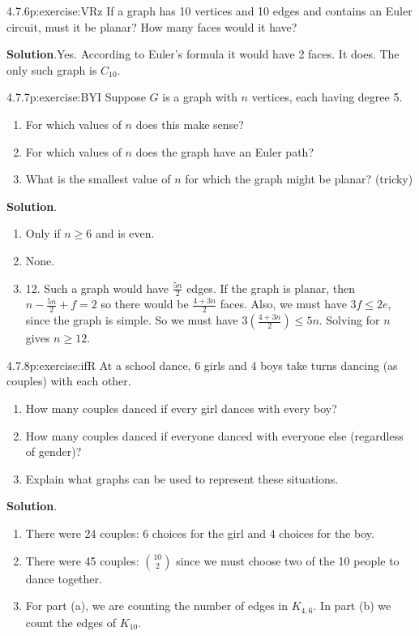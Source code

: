 \documentclass[twoside,11pt,]{book}
\newcommand{\blocktitlefont}{\relax}
\numberwithin{equation}{chapter}
\begin{document}
\begin{divisionsolution}{4.7.6}{}{p:exercise:VRz}%
If a graph has 10 vertices and 10 edges and contains an Euler circuit, must it be planar? How many faces would it have?%
\par\smallskip%
\noindent\textbf{\blocktitlefont Solution}.\quad{}Yes. According to Euler's formula it would have 2 faces. It does. The only such graph is \(C_{10}\).%
\end{divisionsolution}%
\begin{divisionsolution}{4.7.7}{}{p:exercise:BYI}%
Suppose \(G\) is a graph with \(n\) vertices, each having degree 5.%
\begin{enumerate}[label=(\alph*)]
\item{}For which values of \(n\) does this make sense?%
\item{}For which values of \(n\) does the graph have an Euler path?%
\item{}What is the smallest value of \(n\) for which the graph might be planar? (tricky)%
\end{enumerate}
%
\par\smallskip%
\noindent\textbf{\blocktitlefont Solution}.\quad{}%
\begin{enumerate}[label=(\alph*)]
\item{}Only if \(n \ge 6\) and is even.%
\item{}None.%
\item{}12. Such a graph would have \(\frac{5n}{2}\) edges. If the graph is planar, then \(n - \frac{5n}{2} + f = 2\) so there would be \(\frac{4+3n}{2}\) faces. Also, we must have \(3f \le 2e\), since the graph is simple. So we must have \(3\left(\frac{4 + 3n}{2}\right) \le 5n\). Solving for \(n\) gives \(n \ge 12\).%
\end{enumerate}
%
\end{divisionsolution}%
\begin{divisionsolution}{4.7.8}{}{p:exercise:ifR}%
At a school dance, 6 girls and 4 boys take turns dancing (as couples) with each other.%
\begin{enumerate}[label=(\alph*)]
\item{}How many couples danced if every girl dances with every boy?%
\item{}How many couples danced if everyone danced with everyone else (regardless of gender)?%
\item{}Explain what graphs can be used to represent these situations.%
\end{enumerate}
%
\par\smallskip%
\noindent\textbf{\blocktitlefont Solution}.\quad{}%
\begin{enumerate}[label=(\alph*)]
\item{}There were 24 couples: 6 choices for the girl and 4 choices for the boy.%
\item{}There were 45 couples: \({10 \choose 2}\) since we must choose two of the 10 people to dance together.%
\item{}For part (a), we are counting the number of edges in \(K_{4,6}\). In part (b) we count the edges of \(K_{10}\).%
\end{enumerate}
%
\end{divisionsolution}%
\end{document}
